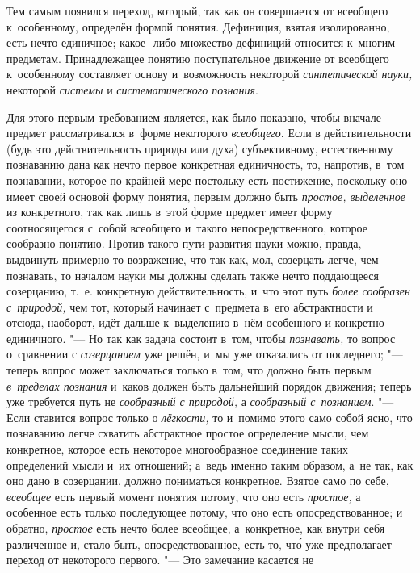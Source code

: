 Тем самым появился переход, который, так как он совершается от
всеобщего к~особенному, определён формой понятия. Дефиниция, взятая
изолированно, есть нечто единичное; какое- либо множество дефиниций
относится к~многим предметам. Принадлежащее понятию поступательное движение
от всеобщего к~особенному составляет основу и~возможность некоторой
{\em синтетической науки,}
некоторой {\em системы}
и {\em систематического
познания}.

Для этого первым требованием является, как было показано,
чтобы вначале предмет рассматривался в~форме некоторого
{\em всеобщего}. Если в
действительности (будь это действительность природы или духа)
субъективному, естественному познаванию дана как нечто первое конкретная
единичность, то, напротив, в~том познавании, которое по крайней мере
постольку есть постижение, поскольку оно имеет своей основой форму понятия,
первым должно быть {\em простое,
выделенное} из конкретного, так как лишь в~этой форме
предмет имеет форму соотносящегося с~собой всеобщего и~такого
непосредственного, которое сообразно понятию. Против такого пути развития
науки можно, правда, выдвинуть примерно то возражение, что так как, мол,
созерцать легче, чем познавать, то началом науки мы должны
сделать также нечто поддающееся созерцанию, т.~е. конкретную
действительность, и~что этот путь
{\em более сообразен с~природой,}
чем тот, который начинает с~предмета в~его абстрактности и
отсюда, наоборот, идёт дальше к~выделению в~нём особенного и
конкретно-единичного. "--- Но так как задача состоит в~том,
чтобы {\em познавать,} то
вопрос о~сравнении с {\em созерцанием}
уже решён, и~мы уже отказались от последнего;
"--- теперь вопрос может заключаться только в~том, что должно
быть первым {\em в~пределах познания}
и~каков должен быть дальнейший порядок движения; теперь уже
требуется путь не {\em сообразный с
природой,} а{\em
сообразный с~познанием}. "--- Если ставится
вопрос только о {\em лёгкости,}
то и~помимо этого само собой ясно, что познаванию легче
схватить абстрактное простое определение мысли, чем конкретное, которое
есть некоторое многообразное соединение таких определений мысли и~их
отношений; а~ведь именно таким образом, а~не так, как оно дано в
созерцании, должно пониматься конкретное. Взятое само по себе,
{\em всеобщее} есть
первый момент понятия потому, что оно есть
{\em простое,} а
особенное есть только последующее потому, что оно есть опосредствованное; и
обратно, {\em простое}
есть нечто более всеобщее, а~конкретное, как внутри себя
различенное и, стало быть, опосредствованное, есть то, чт\'{о} уже предполагает
переход от некоторого первого. "--- Это замечание касается не

